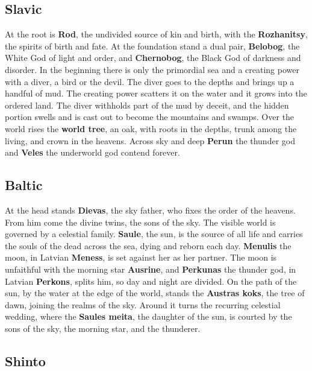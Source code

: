 
\subsection{Slavic}

At the root is \textbf{Rod}, the undivided source of kin and birth, with the \textbf{Rozhanitsy}, the spirits of birth and fate. At the foundation stand a dual pair, \textbf{Belobog}, the White God of light and order, and \textbf{Chernobog}, the Black God of darkness and disorder. In the beginning there is only the primordial sea and a creating power with a diver, a bird or the devil. The diver goes to the depths and brings up a handful of mud. The creating power scatters it on the water and it grows into the ordered land. The diver withholds part of the mud by deceit, and the hidden portion swells and is cast out to become the mountains and swamps. Over the world rises the \textbf{world tree}, an oak, with roots in the depths, trunk among the living, and crown in the heavens. Across sky and deep \textbf{Perun} the thunder god and \textbf{Veles} the underworld god contend forever.

\subsection{Baltic}

At the head stands \textbf{Dievas}, the sky father, who fixes the order of the heavens. From him come the divine twins, the sons of the sky. The visible world is governed by a celestial family. \textbf{Saule}, the sun, is the source of all life and carries the souls of the dead across the sea, dying and reborn each day. \textbf{Menulis} the moon, in Latvian \textbf{Meness}, is set against her as her partner. The moon is unfaithful with the morning star \textbf{Ausrine}, and \textbf{Perkunas} the thunder god, in Latvian \textbf{Perkons}, splits him, so day and night are divided. On the path of the sun, by the water at the edge of the world, stands the \textbf{Austras koks}, the tree of dawn, joining the realms of the sky. Around it turns the recurring celestial wedding, where the \textbf{Saules meita}, the daughter of the sun, is courted by the sons of the sky, the morning star, and the thunderer.

\subsection{Shinto}

